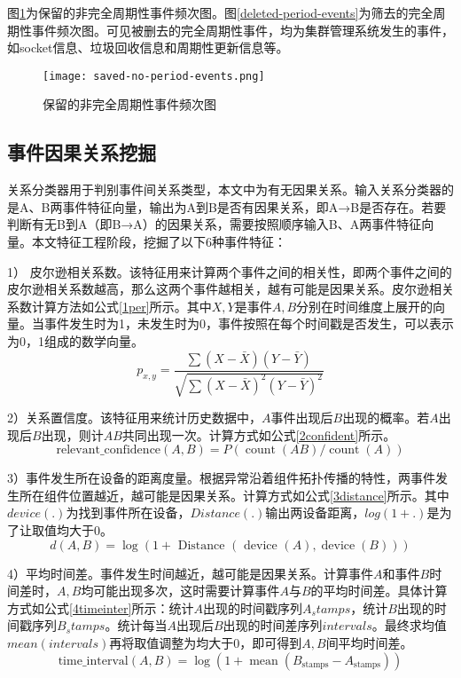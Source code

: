 图\ref{saved-no-period-events}为保留的非完全周期性事件频次图。图\ref{deleted-period-events}为筛去的完全周期性事件频次图。可见被删去的完全周期性事件，均为集群管理系统发生的事件，如socket信息、垃圾回收信息和周期性更新信息等。

\begin{figure}[htbp]
    \centering
    \texttt{[image: saved-no-period-events.png]}
    \caption{保留的非完全周期性事件频次图\label{saved-no-period-events}}
\end{figure}
\subsection{事件因果关系挖掘}
关系分类器用于判别事件间关系类型，本文中为有无因果关系。输入关系分类器的是A、B两事件特征向量，输出为A到B是否有因果关系，即A→B是否存在。若要判断有无B到A（即B→A）的因果关系，需要按照顺序输入B、A两事件特征向量。本文特征工程阶段，挖掘了以下6种事件特征：

1） 皮尔逊相关系数。该特征用来计算两个事件之间的相关性，即两个事件之间的皮尔逊相关系数越高，那么这两个事件越相关，越有可能是因果关系。皮尔逊相关系数计算方法如公式\ref{1per}所示。其中$X,Y$是事件$A,B$分别在时间维度上展开的向量。当事件发生时为1，未发生时为0，事件按照在每个时间戳是否发生，可以表示为0，1组成的数学向量。
\begin{equation}
    p_{x, y}=\frac{\sum(X-\bar{X})(Y-\bar{Y})}{\sqrt{\sum(X-\bar{X})^{2}(Y-\bar{Y})^{2}}}\label{1per}
\end{equation}

2）关系置信度。该特征用来统计历史数据中，$A$事件出现后$B$出现的概率。若$A$出现后$B$出现，则计$AB$共同出现一次。计算方式如公式\ref{2confident}所示。
\begin{equation}
    \operatorname{{ relevant }\_{confidence }}(A, B)=P(\operatorname{count}(A B) / \operatorname{count}(A))\label{2confident}
\end{equation}

3）事件发生所在设备的距离度量。根据异常沿着组件拓扑传播的特性，两事件发生所在组件位置越近，越可能是因果关系。计算方式如公式\ref{3distance}所示。其中$device(.)$为找到事件所在设备，$Distance(.)$输出两设备距离，$log(1+.)$是为了让取值均大于0。
\begin{equation}
    d(A, B)=\log (1+\text { Distance }(\text { device }(A), \operatorname{device}(B)))\label{3distance}
\end{equation}

4）平均时间差。事件发生时间越近，越可能是因果关系。计算事件$A$和事件$B$时间差时，$A,B$均可能出现多次，这时需要计算事件$A$与$B$的平均时间差。具体计算方式如公式\ref{4timeinter}所示：统计$A$出现的时间戳序列$A_stamps$，统计$B$出现的时间戳序列$B_stamps$。统计每当$A$出现后$B$出现的时间差序列$intervals$。最终求均值$mean(intervals)$再将取值调整为均大于0，即可得到$A,B$间平均时间差。
\begin{equation}
    \operatorname{\text{time}\_{interval}}\left ( A,B \right ) =  \log\left ({1+  \operatorname{mean} \left ( B_\text{stamps} - A_\text{stamps} \right ) } \right )\label{4timeinter}
\end{equation}

